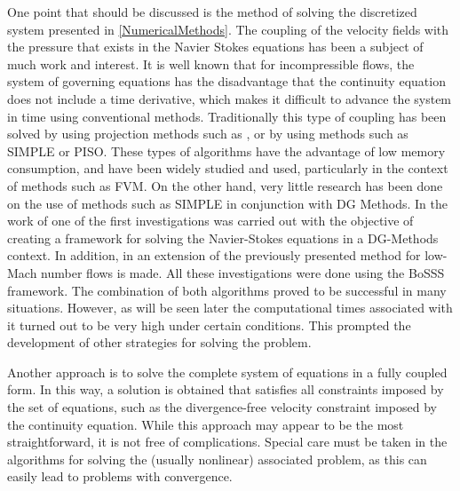 One point that should be discussed is the method of solving the discretized system presented in \cref{NumericalMethods}. The coupling of the velocity fields with the pressure that exists in the Navier Stokes equations has been a subject of much work and interest. It is well known that for incompressible flows, the system of governing equations has the disadvantage that the continuity equation does not include a time derivative, which makes it difficult to advance the system in time using conventional methods. Traditionally this type of coupling has been solved by using projection methods such as \parencite{chorinNumericalSolutionNavierStokes1967}, or by using methods such as SIMPLE \parencite{patankarNumericalHeatTransfer1980} or PISO. These types of algorithms have the advantage of low memory consumption, and have been widely studied and used, particularly in the context of methods such as FVM. On the other hand, very little research has been done on the use of methods such as SIMPLE in conjunction with DG Methods. In the work of \textcite{kleinSIMPLEBasedDiscontinuous2013} one of the first investigations was carried out with the objective of creating a framework for solving the Navier-Stokes equations in a DG-Methods context. In addition, in \parencite{kleinHighorderDiscontinuousGalerkin2016} an extension of the previously presented method for low-Mach number flows is made. All these investigations were done using the BoSSS framework. The combination of both algorithms proved to be successful in many situations. However, as will be seen later the computational times associated with it turned out to be very high under certain conditions. This prompted the development of other strategies for solving the problem. 


Another approach is to solve the complete system of equations in a fully coupled form. In this way, a solution is obtained that satisfies all constraints imposed by the set of equations, such as the divergence-free velocity constraint imposed by the continuity equation. While this approach may appear to be the most straightforward, it is not free of complications. Special care must be taken in the algorithms for solving the (usually nonlinear) associated problem, as this can easily lead to problems with convergence. 

 

